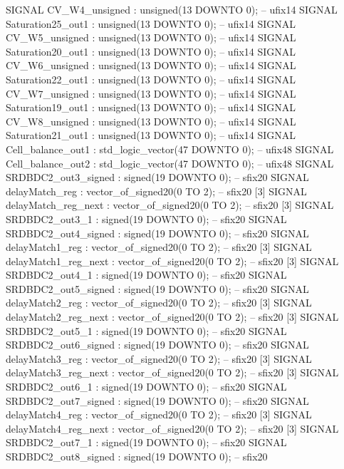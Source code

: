 \begin{mylisting}[language=VHDL,caption=MSSRDCDB制御\&SVPWMモジュール,label=appF_Control_top2_module_VHDL]
  SIGNAL CV_W4_unsigned                   : unsigned(13 DOWNTO 0);  -- ufix14
  SIGNAL Saturation25_out1                : unsigned(13 DOWNTO 0);  -- ufix14
  SIGNAL CV_W5_unsigned                   : unsigned(13 DOWNTO 0);  -- ufix14
  SIGNAL Saturation20_out1                : unsigned(13 DOWNTO 0);  -- ufix14
  SIGNAL CV_W6_unsigned                   : unsigned(13 DOWNTO 0);  -- ufix14
  SIGNAL Saturation22_out1                : unsigned(13 DOWNTO 0);  -- ufix14
  SIGNAL CV_W7_unsigned                   : unsigned(13 DOWNTO 0);  -- ufix14
  SIGNAL Saturation19_out1                : unsigned(13 DOWNTO 0);  -- ufix14
  SIGNAL CV_W8_unsigned                   : unsigned(13 DOWNTO 0);  -- ufix14
  SIGNAL Saturation21_out1                : unsigned(13 DOWNTO 0);  -- ufix14
  SIGNAL Cell_balance_out1                : std_logic_vector(47 DOWNTO 0);  -- ufix48
  SIGNAL Cell_balance_out2                : std_logic_vector(47 DOWNTO 0);  -- ufix48
  SIGNAL SRDBDC2_out3_signed              : signed(19 DOWNTO 0);  -- sfix20
  SIGNAL delayMatch_reg                   : vector_of_signed20(0 TO 2);  -- sfix20 [3]
  SIGNAL delayMatch_reg_next              : vector_of_signed20(0 TO 2);  -- sfix20 [3]
  SIGNAL SRDBDC2_out3_1                   : signed(19 DOWNTO 0);  -- sfix20
  SIGNAL SRDBDC2_out4_signed              : signed(19 DOWNTO 0);  -- sfix20
  SIGNAL delayMatch1_reg                  : vector_of_signed20(0 TO 2);  -- sfix20 [3]
  SIGNAL delayMatch1_reg_next             : vector_of_signed20(0 TO 2);  -- sfix20 [3]
  SIGNAL SRDBDC2_out4_1                   : signed(19 DOWNTO 0);  -- sfix20
  SIGNAL SRDBDC2_out5_signed              : signed(19 DOWNTO 0);  -- sfix20
  SIGNAL delayMatch2_reg                  : vector_of_signed20(0 TO 2);  -- sfix20 [3]
  SIGNAL delayMatch2_reg_next             : vector_of_signed20(0 TO 2);  -- sfix20 [3]
  SIGNAL SRDBDC2_out5_1                   : signed(19 DOWNTO 0);  -- sfix20
  SIGNAL SRDBDC2_out6_signed              : signed(19 DOWNTO 0);  -- sfix20
  SIGNAL delayMatch3_reg                  : vector_of_signed20(0 TO 2);  -- sfix20 [3]
  SIGNAL delayMatch3_reg_next             : vector_of_signed20(0 TO 2);  -- sfix20 [3]
  SIGNAL SRDBDC2_out6_1                   : signed(19 DOWNTO 0);  -- sfix20
  SIGNAL SRDBDC2_out7_signed              : signed(19 DOWNTO 0);  -- sfix20
  SIGNAL delayMatch4_reg                  : vector_of_signed20(0 TO 2);  -- sfix20 [3]
  SIGNAL delayMatch4_reg_next             : vector_of_signed20(0 TO 2);  -- sfix20 [3]
  SIGNAL SRDBDC2_out7_1                   : signed(19 DOWNTO 0);  -- sfix20
  SIGNAL SRDBDC2_out8_signed              : signed(19 DOWNTO 0);  -- sfix20

\end{mylisting}
